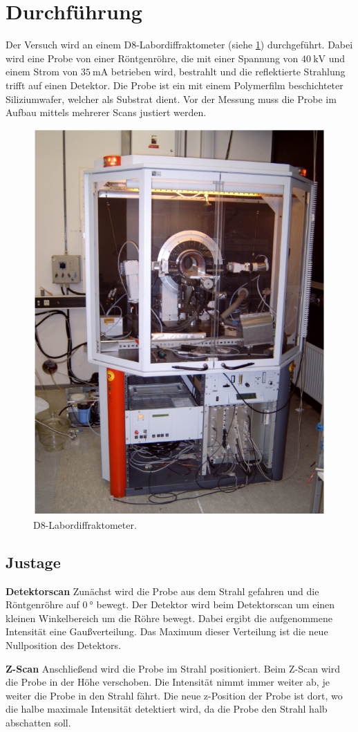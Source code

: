 \section{Durchführung}
\label{sec:durchfuehrung}

Der Versuch wird an einem D8-Labordiffraktometer (siehe \ref{fig:D8}) durchgeführt.
Dabei wird eine Probe von einer Röntgenröhre, die mit einer Spannung von $\SI{40}{\kilo\volt}$ und einem Strom von $\SI{35}{\milli\ampere}$ betrieben wird, bestrahlt und die reflektierte Strahlung trifft auf einen Detektor. %
Die Probe ist ein mit einem Polymerfilm beschichteter Siliziumwafer, welcher als Substrat dient.
Vor der Messung muss die Probe im Aufbau mittels mehrerer Scans justiert werden.

\begin{figure}
    \centering
    \includegraphics[width=0.5\linewidth]{./figures/D8.png}
    \caption{D8-Labordiffraktometer. \cite{anleitung}}
    \label{fig:D8}
\end{figure}



\subsection{Justage}
\textbf{Detektorscan}
\newline
Zunächst wird die Probe aus dem Strahl gefahren und die Röntgenröhre auf $\SI{0}{\degree}$ bewegt. Der Detektor wird beim Detektorscan um einen kleinen Winkelbereich um die Röhre bewegt. Dabei ergibt die aufgenommene Intensität eine Gaußverteilung. Das Maximum dieser Verteilung ist die neue Nullposition des Detektors.

\textbf{Z-Scan}
\newline
Anschließend wird die Probe im Strahl positioniert. Beim Z-Scan wird die Probe in der Höhe verschoben. Die Intensität nimmt immer weiter ab, je weiter die Probe in den Strahl fährt. Die neue z-Position der Probe ist dort, wo die halbe maximale Intensität detektiert wird, da die Probe den Strahl halb abschatten soll.

